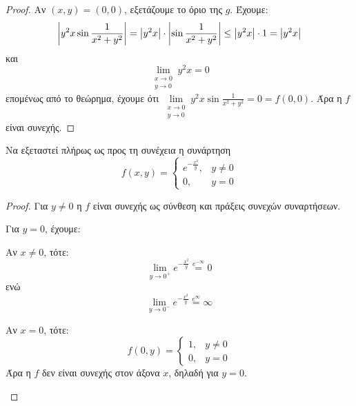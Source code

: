 \begin{examples}
\begin{enumerate}
\begin{proof}
                        Αν $ (x,y)=(0,0) $, εξετάζουμε το όριο της $g$. 
                        Έχουμε:
                        \[
                            \abs{y^{2}x \sin{\frac{1}{x^{2}+y^{2}}}} = \abs{y^{2}x}\cdot \abs{\sin{\frac{1}{x^{2}+y^{2}}}}
                            \leq \abs{y^{2}x} \cdot 1 = \abs{y^{2}x}  
                        \] 
                        και 
                        \[
                            \lim\limits_{\substack{x\to 0 \\y \to 0}} y^{2}x = 0 
                        \] 
                        επομένως από το θεώρημα, έχουμε ότι $ \lim\limits_{\substack{x\to 0 \\y \to 0}} y^{2}x
                        \sin{\frac{1}{x^{2}+y^{2}}} = 0 = f(0,0) $. Άρα η $f$ είναι συνεχής.
                    \end{proof}

                \item Να εξεταστεί πλήρως ως προς τη συνέχεια η συνάρτηση 
                \[
                    f(x,y) = \begin{cases} e^{-\frac{x^{2}}{y}}, & y \neq 0 \\ 0, & y= 0 \end{cases}  
                 \] 
                 \begin{proof}
                 \item {}
                    Για $ y \neq 0 $ η $f$ είναι συνεχής ως σύνθεση και πράξεις συνεχών συναρτήσεων. 

                    Για $ y =0 $, έχουμε:
                    \begin{myitemize}
                    \item Αν $ x \neq 0 $, τότε:
                        \[
                            \lim_{y \to 0^{+}} e^{- \frac{x^{2}}{y}} \overset{e^{- \infty}}{=} 0 
                         \] 
                         ενώ 
                         \[
                             \lim_{y \to 0^{-}} e^{- \frac{x^{2}}{y}} \overset{e^{\infty}}{=} \infty
                          \]
                      \item Αν $ x = 0 $, τότε: 
                          \[
                              f(0,y) = \begin{cases} 1, & y \neq 0 \\ 0, & y= 0 \end{cases} 
                           \] 
                           Άρα η $f$ δεν είναι συνεχής στον άξονα $x$, δηλαδή για $ y=0 $.
                    \end{myitemize}
                 \end{proof}
                    \end{enumerate}
                        \end{examples}



